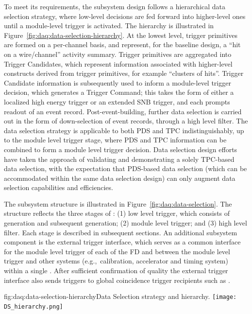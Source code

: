 To meet its requirements, the  subsystem design follows
a hierarchical data selection strategy, where low-level
decisions are fed forward into higher-level ones until a  module-level
trigger is activated. 
 The hierarchy
is illustrated in Figure~\ref{fig:daq:data-selection-hierarchy}. 
At the lowest level, trigger
primitives are formed on a per-channel basis, and represent, for the
baseline design, a ``hit on
a wire/channel'' activity summary. Trigger primitives are aggregated
into Trigger Candidates, which represent information associated with
higher-level constructs derived from trigger primitives,
for example
``clusters of hits''. Trigger
Candidate information is subsequently used to inform a module-level trigger decision, which
generates a Trigger Command; this takes the form of either a localized high energy
trigger or an extended SNB trigger, and each prompts readout of an
event record. Post-event-building, further data selection is carried
out in the form of down-selection of event records, through a high
level filter. The data selection strategy is applicable to both PDS
and TPC indistinguishably, up to the module level trigger stage, where
PDS and TPC information can be combined to form a module level trigger
decision. Data selection design efforts
have taken the approach of validating and demonstrating a solely
TPC-based data selection, with the expectation that PDS-based data
selection (which can be accommodated within the same data selection design)
can only augment data selection capabilities and
efficiencies.

The subsystem structure is illustrated in
Figure~\ref{fig:daq:data-selection}. The structure
reflects the three stages of : (1) low level trigger, which consists of
 generation and subsequent
 generation; (2) module level trigger; and (3)
high level filter. Each stage is described in subsequent
sections. An additional subsystem component is the external trigger interface,
which serves as a common interface for the
module level trigger of each of the FD  and between
the module level trigger and other systems (e.g.,~calibration,
accelerator and timing system) within a single
. After sufficient confirmation of quality the
external trigger interface also sends  triggers
to global coincidence trigger recipients such as   \cite{xx}.


\begin{dunefigure}{fig:daq:data-selection-hierarchy}{Data Selection
    strategy and hierarchy.}
  \texttt{[image: DS\_hierarchy.png]}
\end{dunefigure}

